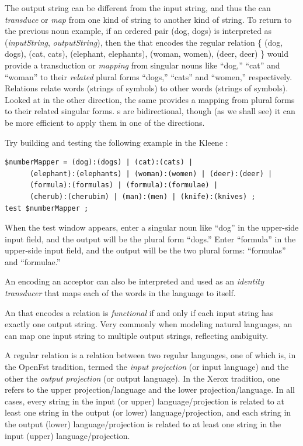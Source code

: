 The output string can be different from the input string, and thus
the \fst{} can \emph{transduce} or \emph{map} from one kind of string to another kind of string.  To return to the
previous noun example, if an ordered pair (dog, dogs) is interpreted as (\emph{inputString},
\emph{outputString}),
then the \fst{} that encodes the regular relation \{ (dog, dogs), (cat, cats), (elephant,
elephants), (woman, women), (deer, deer) \} would provide a transduction or \emph{mapping}
from singular nouns like ``dog,'' ``cat'' and ``woman'' to their \emph{related} plural forms ``dogs,''
``cats'' and ``women,'' respectively.  Relations relate words (strings of symbols) to other
words (strings of symbols). 
Looked at in the other direction,
the same \fst{} provides a mapping from plural forms to their
related singular forms.  \fst{}s are bidirectional, though (as we
shall see) it can be more efficient to apply them in one of the
directions.

Try building and testing the following example in the Kleene \gui{}:


\begin{Verbatim}
$numberMapper = (dog):(dogs) | (cat):(cats) | 
      (elephant):(elephants) | (woman):(women) | (deer):(deer) |
      (formula):(formulas) | (formula):(formulae) |
      (cherub):(cherubim) | (man):(men) | (knife):(knives) ;
test $numberMapper ;
\end{Verbatim}

\noindent
When the test window appears, enter a singular noun like ``dog'' in the upper-side input field, and the output
will be the plural form ``dogs.''  Enter ``formula'' in the upper-side input
field, and the output will be the two plural forms:  ``formulas'' and
``formulae.''  

An \fsm{} encoding an acceptor can also be interpreted and used as an \emph{identity transducer}
that maps each of the words in the language to itself.

An \fst{} that encodes a relation is \emph{functional} if and only if each input string has exactly one
output string.  Very commonly when modeling natural languages, an \fst{} can map one input
string to multiple output strings, reflecting ambiguity. 

A regular relation is a relation between two regular languages, one of which is, in the
OpenFst tradition, termed the
\emph{input projection} (or input language) and the other the
\emph{output projection} (or output language).  In the Xerox tradition,
one refers to the upper projection/language and the lower
projection/language.  In all cases, every
string in the input (or upper) language/projection is related to at least one
string in the output (or lower) language/projection, and each string in
the output (lower) language/projection is related to at
least one string in the input (upper) language/projection.

